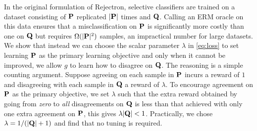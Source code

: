  In the original formulation of Rejectron, selective classifiers are trained on a dataset consisting of $\mathbf{P}$ replicated $|\mathbf{P}|$ times and $\mathbf{Q}$.
Calling an ERM oracle on this data ensures that a misclassification on $\mathbf{P}$ is significantly more costly than one on $\mathbf{Q}$ but requires $\Omega(|\mathbf{P}|^2 )$ samples, an impractical number for large datasets.
We show that instead we can choose the scalar parameter $\lambda$ in \autoref{eq:loss} to set learning $\mathbf{P}$ as the primary learning objective and only when it cannot be improved, we allow $g$ to learn how to disagree on $\mathbf{Q}$.
The reasoning is a simple counting argument.
Suppose agreeing on each sample in $\mathbf{P}$ incurs a reward of $1$ and disagreeing with each sample in $\mathbf{Q}$ a reward of $\lambda$.
To encourage agreement on $\mathbf{P}$ as the primary objective, we set $\lambda$ such that the extra reward obtained by going from \textit{zero} to \textit{all} disagreements on $\mathbf{Q}$ is less than that achieved with only one extra agreement on $\mathbf{P}$, this gives $\lambda|\mathbf{Q}| < 1$.
Practically, we chose $\lambda=1/(|\mathbf{Q}| + 1)$ and find that no tuning is required.


